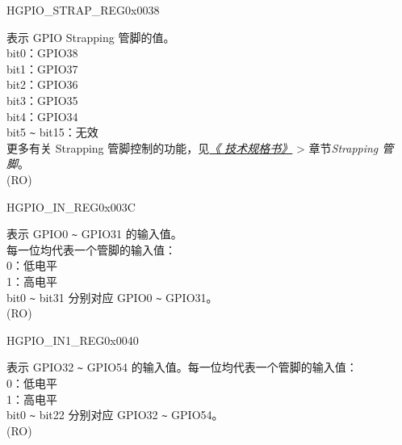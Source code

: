 \begin{register}{H}{GPIO\_STRAP\_REG}{0x0038}\label{regdesc:GPIOSTRAPREG}
%
%
\regnewline%
\begin{regdesc}\begin{reglist}
\label{fielddesc:GPIOSTRAPPING}\item [GPIO\_STRAPPING] 表示 GPIO Strapping 管脚的值。\\
bit0：GPIO38\\
bit1：GPIO37\\
bit2：GPIO36\\
bit3：GPIO35\\
bit4：GPIO34\\
bit5 \verb+~+ bit15：无效\\
更多有关 Strapping 管脚控制的功能，见\textit{\href{https://www.espressif.com/sites/default/files/documentation/esp32-p4_datasheet_cn.pdf}{《\chipname{} 技术规格书》}} > 章节\textit{Strapping 管脚}。\\
(RO)
\end{reglist}\end{regdesc}
\end{register}

\begin{register}{H}{GPIO\_IN\_REG}{0x003C}\label{regdesc:GPIOINREG}
%
\regnewline%
\begin{regdesc}\begin{reglist}
\label{fielddesc:GPIOINDATANEXT}\item [GPIO\_IN\_DATA\_NEXT] 表示 GPIO0 \verb+~+ GPIO31 的输入值。\\每一位均代表一个管脚的输入值：\\
0：低电平\\
1：高电平\\
bit0 \verb+~+ bit31 分别对应 GPIO0 \verb+~+ GPIO31。\\
(RO)
\end{reglist}\end{regdesc}
\end{register}


\begin{register}{H}{GPIO\_IN1\_REG}{0x0040}\label{regdesc:GPIOIN1REG}
%
%
\regnewline%
\begin{regdesc}\begin{reglist}
\label{fielddesc:GPIOIN1DATANEXT}\item [GPIO\_IN1\_DATA\_NEXT] 表示 GPIO32 \verb+~+ GPIO54 的输入值。每一位均代表一个管脚的输入值：\\
0：低电平\\
1：高电平\\
bit0 \verb+~+ bit22 分别对应 GPIO32 \verb+~+ GPIO54。 \\
(RO)
\end{reglist}\end{regdesc}
\end{register}


